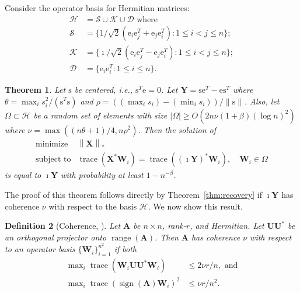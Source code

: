 \documentclass{sig-alternate}
\newtheorem{theorem}{Theorem}
\newtheorem{definition}[theorem]{Definition}
\DeclareMathOperator{\tr}{trace}
\DeclareMathOperator{\sign}{sign}
\newcommand{\mat}{\boldsymbol}
\renewcommand{\vec}[1]{\boldsymbol{\mathrm{#1}}}
\providecommand{\mA}{\ensuremath{\mat{A}}}
\providecommand{\mU}{\ensuremath{\mat{U}}}
\providecommand{\mW}{\ensuremath{\mat{W}}}
\providecommand{\mX}{\ensuremath{\mat{X}}}
\providecommand{\mY}{\ensuremath{\mat{Y}}}
\providecommand{\ve}{\ensuremath{\vec{e}}}
\providecommand{\vs}{\ensuremath{\vec{s}}}
\DeclareMathOperator*{\minimize}{minimize}
\DeclareMathOperator{\subjectto}{subject\ to}
\providecommand{\MINof}[1][]{{\displaystyle \minimize_{#1}}}
\providecommand{\MINone}[3]{\begin{array}{ll} \MINof[#1] & #2 \\ \subjectto  & #3 \end{array}}
\newcommand{\sstretchsym}[3]{\ensuremath{\left#1 #3 \right#2}}
\newcommand{\nstretchsym}[3]{\ensuremath{#1 #3 #2}}
\newcommand{\normof}[2][]{\sstretchsym{\|}{\|}{#2}_{#1}}
\newcommand{\nnormof}[2][]{\nstretchsym{\|}{\|}{#2}_{#1}}
\begin{document}
Consider the operator basis for Hermitian matrices:
\[ \begin{aligned}
\mathcal{H} & = \mathcal{S} \cup \mathcal{K} \cup \mathcal{D} \text{ where } \\
\mathcal{S} & = \{ 1/\sqrt{2}(\ve_i \ve_j^T + \ve_j \ve_i^T) : 1 \le i < j \le n \}; \\
\mathcal{K} & = \{ \imath/\sqrt{2}(\ve_i \ve_j^T - \ve_j \ve_i^T) : 1 \le i < j \le n \}; \\
\mathcal{D} & = \{ \ve_i \ve_i^T : 1 \le i \le n \}.
\end{aligned} \] 
\begin{theorem}
\label{thm:score-recovery}
Let $\vs$ be centered, i.e., $\vs^T \ve = 0$.
Let $\mY = \vs \ve^T - \ve \vs^T$ where  
$\theta = \max_i s_i^2/(\vs^T \vs)$ and
   $\rho = ((\max_i s_i) - (\min_i s_i))/\nnormof{\vs}$.
Also, let $\Omega \subset \mathcal{H}$ be a random set of 
elements with size $|\Omega| \ge O(2n\nu (1+\beta) (\log n)^2)$
where $\nu = \max( (n\theta + 1)/4, n \rho^2 )$. 
Then the solution of 
\[ \MINone{}{\normof[*]{\mX}}{\tr(\mX^* \mW_i) = \tr((\imath \mY)^* \mW_i), \quad \mW_i \in \Omega}
\]
is equal to $\imath \mY$ with probability at least $1-n^{-\beta}$.	
\end{theorem}
The proof of this theorem follows directly by
Theorem~\ref{thm:recovery} if $\imath \mY$ has coherence
$\nu$ with respect to the basis $\mathcal{H}$.
We now show this result.
\begin{definition}[Coherence, \citet{Gross2010-low-rank}] 
Let $\mA$ be $n \times n$, rank-$r$,
and Hermitian.  Let $\mU\mU^*$ be an orthogonal projector
onto $\mathop{\mathrm{range}}(\mA)$.
Then $\mA$ has
coherence $\nu$ with respect to an operator basis 
$\{ \mW_i \}_{i=1}^{n^2}$ if both
\[ \begin{aligned}
\max\nolimits_i \tr(\mW_i \mU \mU^* \mW_i) & \le 2 \nu r/n, \text{ and} \\
\max\nolimits_i \tr(\sign(\mA) \mW_i)^2 & \le \nu r/n^2. \\
\end{aligned} \]
\end{definition}
\end{document}
